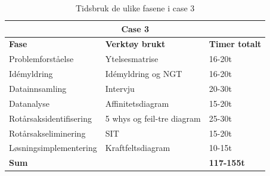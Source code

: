 \begin{table}[H]
  \centering
  \caption{Tidsbruk de ulike fasene i case 3}
    \begin{tabular}{|lr|l|}
    \hline
    \multicolumn{3}{|c|}{\cellcolor{yellow}\textbf{Case 3}} \\
    \hline
    \multicolumn{1}{|l|}{\cellcolor{apricot}\textbf{Fase}} & \multicolumn{1}{l|}{\cellcolor{apricot}\textbf{Verktøy brukt}} & \cellcolor{apricot}\textbf{Timer totalt} \\
    \hline
    \multicolumn{1}{|l|}{Problemforståelse} & \multicolumn{1}{l|}{Ytelsesmatrise} & 16-20t \\
    \hline
    \multicolumn{1}{|l|}{Idémyldring} & \multicolumn{1}{l|}{Idémyldring og NGT} & 16-20t \\
    \hline
    \multicolumn{1}{|l|}{Datainnsamling} & \multicolumn{1}{l|}{Intervju} & 20-30t \\
    \hline
    \multicolumn{1}{|l|}{Datanalyse} & \multicolumn{1}{l|}{Affinitetsdiagram} & 15-20t \\
    \hline
    \multicolumn{1}{|l|}{Rotårsaksidentifisering} & \multicolumn{1}{l|}{5 whys og feil-tre diagram} & 25-30t \\
    \hline
    \multicolumn{1}{|l|}{Rotårsakseliminering} & \multicolumn{1}{l|}{SIT} & 15-20t \\
    \hline
    \multicolumn{1}{|l|}{Løsningsimplementering} & \multicolumn{1}{l|}{Kraftfeltsdiagram} & 10-15t \\
    \hline
    \multicolumn{2}{|l|}{\textbf{Sum}} & \textbf{117-155t} \\
    \hline
    \end{tabular}%
  \label{tab:tidsbruk_case3}%
\end{table}%
